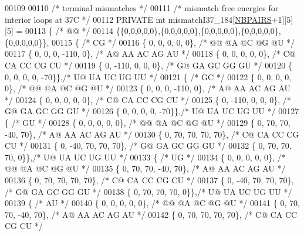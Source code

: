 \begin{DoxyCode}
00109 
00110 \textcolor{comment}{/* terminal mismatches */}
00111 \textcolor{comment}{/* mismatch free energies for interior loops at 37C */}
00112 PRIVATE \textcolor{keywordtype}{int} mismatchI37\_184[\hyperlink{energy__const_8h_a5e75221c779d618eab81e096f37e32ce}{NBPAIRS}+1][5][5] =
00113 \{ \textcolor{comment}{/* @@ */}
00114   \{\{0,0,0,0,0\},\{0,0,0,0,0\},\{0,0,0,0,0\},\{0,0,0,0,0\},\{0,0,0,0,0\}\},
00115   \{ \textcolor{comment}{/* CG */}
00116    \{   0,    0,    0,    0,    0\}, \textcolor{comment}{/* @@  @A  @C  @G  @U */}
00117    \{   0,    0,    0, -110,    0\}, \textcolor{comment}{/* A@  AA  AC  AG  AU */}
00118    \{   0,    0,    0,    0,    0\}, \textcolor{comment}{/* C@  CA  CC  CG  CU */}
00119    \{   0, -110,    0,    0,    0\}, \textcolor{comment}{/* G@  GA  GC  GG  GU */}
00120    \{   0,    0,    0,    0,  -70\}\},\textcolor{comment}{/* U@  UA  UC  UG  UU */}
00121   \{ \textcolor{comment}{/* GC */}
00122    \{   0,    0,    0,    0,    0\}, \textcolor{comment}{/* @@  @A  @C  @G  @U */}
00123    \{   0,    0,    0, -110,    0\}, \textcolor{comment}{/* A@  AA  AC  AG  AU */}
00124    \{   0,    0,    0,    0,    0\}, \textcolor{comment}{/* C@  CA  CC  CG  CU */}
00125    \{   0, -110,    0,    0,    0\}, \textcolor{comment}{/* G@  GA  GC  GG  GU */}
00126    \{   0,    0,    0,    0,  -70\}\},\textcolor{comment}{/* U@  UA  UC  UG  UU */}
00127   \{ \textcolor{comment}{/* GU */}
00128    \{   0,    0,    0,    0,    0\}, \textcolor{comment}{/* @@  @A  @C  @G  @U */}
00129    \{   0,   70,   70,  -40,   70\}, \textcolor{comment}{/* A@  AA  AC  AG  AU */}
00130    \{   0,   70,   70,   70,   70\}, \textcolor{comment}{/* C@  CA  CC  CG  CU */}
00131    \{   0,  -40,   70,   70,   70\}, \textcolor{comment}{/* G@  GA  GC  GG  GU */}
00132    \{   0,   70,   70,   70,    0\}\},\textcolor{comment}{/* U@  UA  UC  UG  UU */}
00133   \{ \textcolor{comment}{/* UG */}
00134    \{   0,    0,    0,    0,    0\}, \textcolor{comment}{/* @@  @A  @C  @G  @U */}
00135    \{   0,   70,   70,  -40,   70\}, \textcolor{comment}{/* A@  AA  AC  AG  AU */}
00136    \{   0,   70,   70,   70,   70\}, \textcolor{comment}{/* C@  CA  CC  CG  CU */}
00137    \{   0,  -40,   70,   70,   70\}, \textcolor{comment}{/* G@  GA  GC  GG  GU */}
00138    \{   0,   70,   70,   70,    0\}\},\textcolor{comment}{/* U@  UA  UC  UG  UU */}
00139   \{ \textcolor{comment}{/* AU */}
00140    \{   0,    0,    0,    0,    0\}, \textcolor{comment}{/* @@  @A  @C  @G  @U */}
00141    \{   0,   70,   70,  -40,   70\}, \textcolor{comment}{/* A@  AA  AC  AG  AU */}
00142    \{   0,   70,   70,   70,   70\}, \textcolor{comment}{/* C@  CA  CC  CG  CU */}

\end{DoxyCode}
